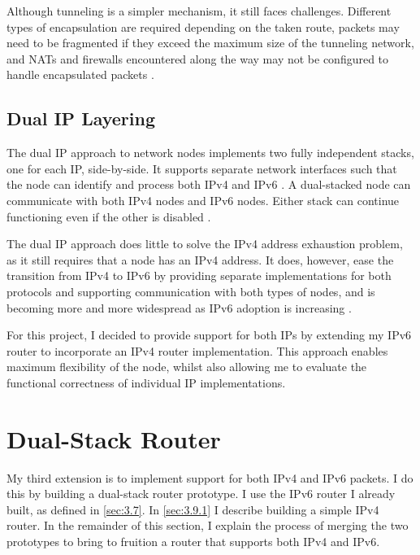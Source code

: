 Although tunneling is a simpler mechanism, it still faces challenges. Different types of encapsulation are required depending on the taken route, packets may need to be fragmented if they exceed the maximum size of the tunneling network, and NATs and firewalls encountered along the way may not be configured to handle encapsulated packets \cite{TransitionsPaper}.



\subsection{Dual IP Layering}
\label{sec:3.8.3}

The dual IP approach to network nodes implements two fully independent stacks, one for each IP, side-by-side. It supports separate network interfaces such that the node can identify and process both IPv4 and IPv6 \cite{DualStack}. A dual-stacked node can communicate with both IPv4 nodes and IPv6 nodes. Either stack can continue functioning even if the other is disabled \cite{DualStackSpecs}.

The dual IP approach does little to solve the IPv4 address exhaustion problem, as it still requires that a node has an IPv4 address. It does, however, ease the transition from IPv4 to IPv6 by providing separate implementations for both protocols and supporting communication with both types of nodes, and is becoming more and more widespread as IPv6 adoption is increasing \cite{DualStack}. 

For this project, I decided to provide support for both IPs by extending my IPv6 router to incorporate an IPv4 router implementation. This approach enables maximum flexibility of the node, whilst also allowing me to evaluate the functional correctness of individual IP implementations.



\section{Dual-Stack Router}
\label{sec:3.9}

My third extension is to implement support for both IPv4 and IPv6 packets. I do this by building a dual-stack router prototype. I use the IPv6 router I already built, as defined in \cref{sec:3.7}. In \cref{sec:3.9.1} I describe building a simple IPv4 router. In the remainder of this section, I explain the process of merging the two prototypes to bring to fruition a router that supports both IPv4 and IPv6.



